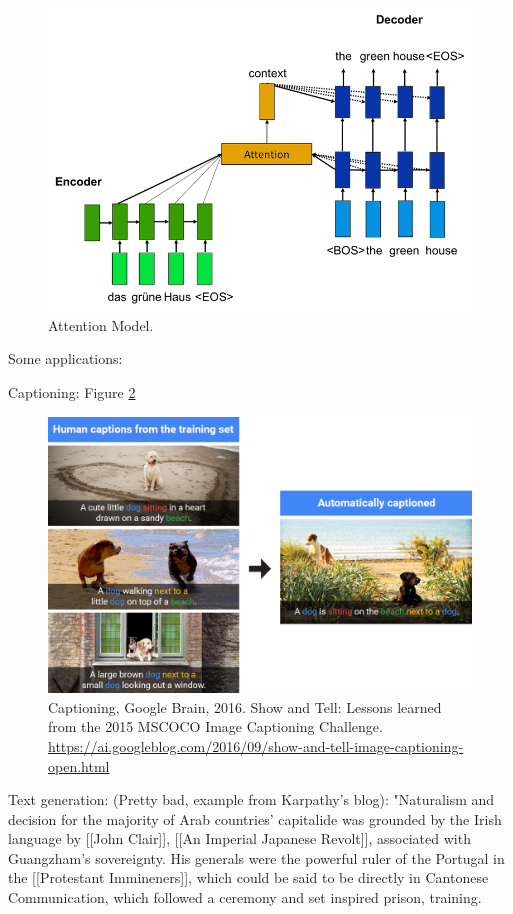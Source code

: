\documentclass[english]{article}
\begin{document}
\begin{figure}
  \centering
  \includegraphics[scale=0.3]{attn}
    \caption{Attention Model.}
    \label{attn}
\end{figure}


\item Some applications: 

Captioning: Figure \ref{c}

\begin{figure}
  \centering
  \includegraphics[scale=0.4]{Caption4.png}
    \caption{Captioning,  Google Brain, 2016. Show and Tell: Lessons learned from the 2015 MSCOCO Image Captioning Challenge. \url{https://ai.googleblog.com/2016/09/show-and-tell-image-captioning-open.html}}
    \label{c}
\end{figure}

Text generation: (Pretty bad, example from Karpathy's blog): "Naturalism and decision for the majority of Arab countries' capitalide was grounded
by the Irish language by [[John Clair]], [[An Imperial Japanese Revolt]], associated  with Guangzham's sovereignty. His generals were the powerful ruler of the Portugal 
in the [[Protestant Immineners]], which could be said to be directly in Cantonese 
Communication, which followed a ceremony and set inspired prison, training.
\end{document}
